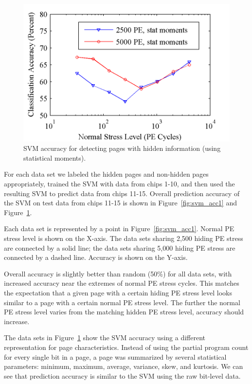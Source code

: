 \begin{figure} 
\begin{center} 
\includegraphics[width=\mywidth]{figs/svm_stat_moments.png} 
\caption{SVM accuracy for detecting pages with hidden information (using statistical moments).}
\label{fig:svm_acc2} 
\vspace{-0.1in}
\end{center} 
\end{figure}

For each data set we labeled the hidden pages and non-hidden pages
appropriately, trained the SVM with data from chips 1-10, and then used the
resulting SVM to predict data from chips 11-15. Overall prediction accuracy of
the SVM on test data from chips 11-15 is shown in Figure~\ref{fig:svm_acc1} 
and Figure~\ref{fig:svm_acc2}.

Each data set is represented by a point in Figure~\ref{fig:svm_acc1}. Normal
PE stress level is shown on the X-axis. The data sets sharing 2,500 hiding
PE
stress are connected by a solid line; the data sets sharing 5,000 hiding
PE stress are connected by a dashed line. Accuracy is shown on the Y-axis.

Overall accuracy is slightly better than random (50\%) for all data sets, with
increased accuracy near the extremes of normal PE stress cycles. This matches
the expectation that a given page with a certain hiding PE stress level
looks similar to a page with a certain normal PE stress level. The further
the normal PE stress level varies from the matching hidden PE stress level,
accuracy should increase.

The data sets in
Figure~\ref{fig:svm_acc2} show the SVM accuracy using a different representation
for page characteristics. Instead of using the partial program 
count for every single bit in a page,
a page was summarized by several statistical parameters:
minimum, maximum, average, variance, skew, and kurtosis. We can see that
prediction accuracy is similar to the SVM using the raw bit-level data.

